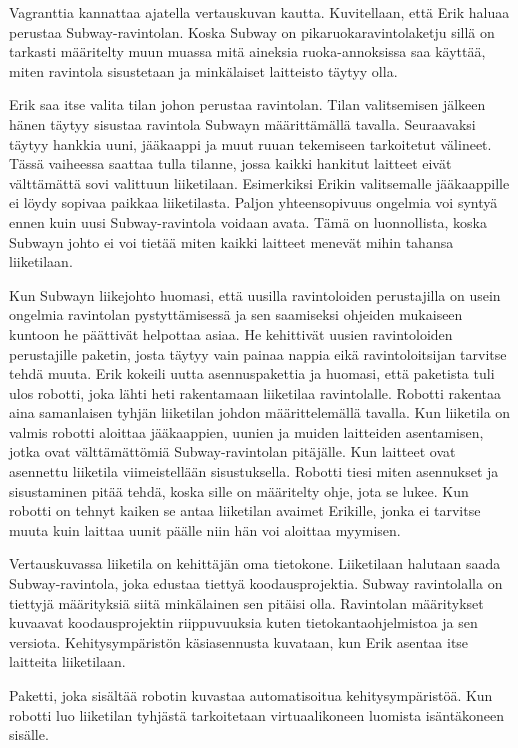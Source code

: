 Vagranttia kannattaa ajatella vertauskuvan kautta. Kuvitellaan, että Erik haluaa perustaa Subway-ravintolan. Koska Subway on pikaruokaravintolaketju sillä on tarkasti määritelty muun muassa mitä aineksia ruoka-annoksissa saa käyttää, miten ravintola sisustetaan ja minkälaiset laitteisto täytyy olla.

Erik saa itse valita tilan johon perustaa ravintolan. Tilan valitsemisen jälkeen hänen täytyy sisustaa ravintola Subwayn määrittämällä tavalla. Seuraavaksi täytyy hankkia uuni, jääkaappi ja muut ruuan tekemiseen tarkoitetut välineet. Tässä vaiheessa saattaa tulla tilanne, jossa kaikki hankitut laitteet eivät välttämättä sovi valittuun liiketilaan. Esimerkiksi Erikin valitsemalle jääkaappille ei löydy sopivaa paikkaa liiketilasta. Paljon yhteensopivuus ongelmia voi syntyä ennen kuin uusi Subway-ravintola voidaan avata. Tämä on luonnollista, koska Subwayn johto ei voi tietää miten kaikki laitteet menevät mihin tahansa liiketilaan.

Kun Subwayn liikejohto huomasi, että uusilla ravintoloiden perustajilla on usein ongelmia ravintolan pystyttämisessä ja sen saamiseksi ohjeiden mukaiseen kuntoon he päättivät helpottaa asiaa. He kehittivät uusien ravintoloiden perustajille paketin, josta täytyy vain painaa nappia eikä ravintoloitsijan tarvitse tehdä muuta. Erik kokeili uutta asennuspakettia ja huomasi, että paketista tuli ulos robotti, joka lähti heti rakentamaan liiketilaa ravintolalle. Robotti rakentaa aina samanlaisen tyhjän liiketilan johdon määrittelemällä tavalla. Kun liiketila on valmis robotti aloittaa jääkaappien, uunien ja muiden laitteiden asentamisen, jotka ovat välttämättömiä Subway-ravintolan pitäjälle. Kun laitteet ovat asennettu liiketila viimeistellään sisustuksella. Robotti tiesi miten asennukset ja sisustaminen pitää tehdä, koska sille on määritelty ohje, jota se lukee. Kun robotti on tehnyt kaiken se antaa liiketilan avaimet Erikille, jonka ei tarvitse muuta kuin laittaa uunit päälle niin hän voi aloittaa myymisen.

Vertauskuvassa liiketila on kehittäjän oma tietokone. Liiketilaan halutaan saada Subway-ravintola, joka edustaa tiettyä koodausprojektia. Subway ravintolalla on tiettyjä määrityksiä siitä minkälainen sen pitäisi olla. Ravintolan määritykset kuvaavat koodausprojektin riippuvuuksia kuten tietokantaohjelmistoa ja sen versiota. Kehitysympäristön käsiasennusta kuvataan, kun Erik asentaa itse laitteita liiketilaan.

Paketti, joka sisältää robotin kuvastaa automatisoitua kehitysympäristöä. Kun robotti luo liiketilan tyhjästä tarkoitetaan virtuaalikoneen luomista isäntäkoneen sisälle.

